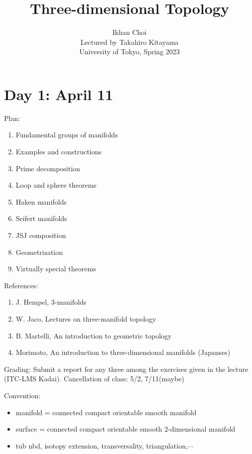 \documentclass{../../../small}
\begin{document}
\title{Three-dimensional Topology}
\author{Ikhan Choi\\Lectured by Takahiro Kitayama\\University of Tokyo, Spring 2023}
\maketitle
\tableofcontents

\newpage
\section{Day 1: April 11}

Plan:
\begin{enumerate}
\item Fundamental groups of manifolds
\item Examples and constructions
\item Prime decomposition
\item Loop and sphere theorems
\item Haken manifolds
\item Seifert manifolds
\item JSJ composition
\item Geometrization
\item Virtually special theorems
\end{enumerate}

\noindent References:
\begin{enumerate}
\item J. Hempel, 3-manifolds
\item W. Jaco, Lectures on three-manifold topology
\item B. Martelli, An introduction to geometric topology
\item Morimoto, An introduction to three-dimensional manifolds (Japanses)
\end{enumerate}

\noindent Grading:
Submit a report for any three among the exercises given in the lecture (ITC-LMS Kadai).
Cancellation of class: 5/2, 7/11(maybe)

\noindent Convention:
\begin{itemize}
\item manifold = connected compact orientable smooth manifold
\item surface = connected compact orientable smooth 2-dimensional manifold
\item tub nbd, isotopy extension, transversality, triangulation,$\cdots$
\end{itemize}
\end{document}

